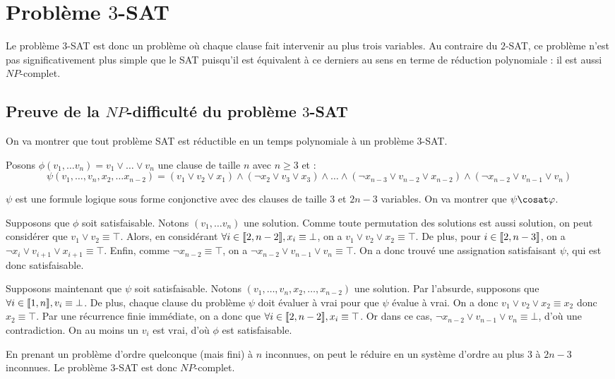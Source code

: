 \section{Problème $3$-SAT}
Le problème $3$-SAT est donc un problème où chaque clause fait intervenir au
plus trois variables. Au contraire du $2$-SAT, ce problème n'est pas
significativement plus simple que le SAT puisqu'il est équivalent à ce derniers
au sens en terme de réduction polynomiale : il est aussi $NP$-complet.

\subsection{Preuve de la $NP$-difficulté du problème $3$-SAT}
On va montrer que tout problème SAT est réductible en un temps polynomiale à
un problème 3-SAT.

Posons $\phi(v_1,\dots v_n) = v_1 \vee \dots \vee v_n$ une clause de taille
$n$ avec $n\geq 3$ et :
\[ \psi(v_1, \dots, v_n, x_2, \dots x_{n-2})
        = (v_1 \vee v_2 \vee x_1)
   \wedge (\neg x_2 \vee v_3 \vee x_3) \wedge \ldots
   \wedge (\neg x_{n-3} \vee v_{n-2} \vee x_{n-2})
   \wedge (\neg x_{n-2} \vee v_{n-1} \vee v_n) \]

$\psi$ est une formule logique sous forme conjonctive avec des clauses de
taille $3$ et $2n-3$ variables. On va montrer que $\psi \cosat \phi$.

Supposons que $\phi$ soit satisfaisable. Notons $(v_1,\ldots v_n)$ une
solution. Comme toute permutation des solutions est aussi solution, on peut
considérer que $v_1 \vee v_2 \equiv \top$. Alors, en considérant
$\forall i\in\llbracket 2, n-2 \rrbracket, x_i \equiv \bot$, on a
$v_1 \vee v_2 \vee x_2 \equiv \top$. De plus, pour $i\in\llbracket 2, n-3 \rrbracket$, on a
$\neg x_i \vee v_{i+1} \vee x_{i+1} \equiv \top$. Enfin, comme
$\neg x_{n-2} \equiv \top$, on a
$\neg x_{n-2} \vee v_{n-1} \vee v_n \equiv \top$. On a donc trouvé une
assignation satisfaisant $\psi$, qui est donc satisfaisable.

Supposons maintenant que $\psi$ soit satisfaisable. Notons
$(v_1,\ldots,v_n,x_2,\ldots,x_{n-2})$ une solution. Par l'absurde, supposons
que $\forall i\in\llbracket 1, n \rrbracket, v_i \equiv \bot$. De plus, chaque clause du
problème $\psi$ doit évaluer à vrai pour que $\psi$ évalue à vrai. On a donc
$v_1\vee v_2\vee x_2 \equiv x_2$ donc $x_2 \equiv \top$. Par une récurrence
finie immédiate, on a donc que $\forall i\in\llbracket 2, n-2 \rrbracket, x_i \equiv\top$. Or
dans ce cas, $\neg x_{n-2}\vee v_{n-1}\vee v_n \equiv\bot$, d'où une
contradiction. On au moins un $v_i$ est vrai, d'où $\phi$ est satisfaisable.

En prenant un problème d'ordre quelconque (mais fini) à $n$ inconnues, on
peut le réduire en un système d'ordre au plus $3$ à $2n-3$ inconnues. Le
problème $3$-SAT est donc $NP$-complet.

